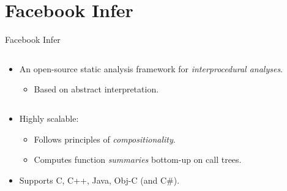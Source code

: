 \documentclass[%
    10pt, xcolor=pdflatex, hyperref={unicode}, aspectratio=169%
]{beamer}
\begin{document}
\section{Facebook Infer}
\begin{frame}{Facebook Infer}
    \begin{columns}
        \begin{column}{1 \linewidth}
            \begin{itemize}
                \item
                    An open-source \alert{static analysis framework}
                    for \emph{interprocedural analyses}.
                    \smallskip
                    \begin{itemize}\setlength\itemsep{1em}
                        \item
                            Based on \alert{abstract interpretation}.
                    \end{itemize}
            \end{itemize}
        \end{column}

        \hfill
    \end{columns}

    \begin{columns}
        \begin{column}{.55 \linewidth}
            \begin{itemize}\setlength\itemsep{2em}
                \item
                    Highly \alert{scalable}:
                    \smallskip
                    \begin{itemize}\setlength\itemsep{1em}
                        \item
                            Follows principles of \emph{compositionality}.

                        \item
                            Computes function \emph{summaries}
                            \alert{bottom-up} on call trees.
                    \end{itemize}

                \item
                    Supports C, C++, Java, Obj-C (and C\#).
            \end{itemize}
        \end{column}


\end{columns}
\end{frame}
\end{document}
